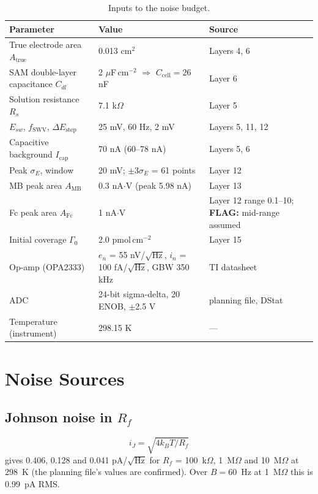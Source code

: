\documentclass[10pt]{article}
\numberwithin{equation}{section}
\newcommand{\flag}[1]{\textbf{FLAG:} #1}
\begin{document}
\begin{table}[h]
\centering\small
\begin{tabular}{@{}p{4.5cm}p{5.8cm}p{5.0cm}@{}}
\toprule
Parameter & Value & Source \\
\midrule
True electrode area $A_{\text{true}}$ & 0.013 cm$^2$ & Layers 4, 6 \\
SAM double-layer capacitance $C_{dl}$ & 2 $\mu$F\,cm$^{-2}$ $\Rightarrow$ $C_{\text{cell}} = 26$ nF & Layer 6 \\
Solution resistance $R_s$ & 7.1 k$\Omega$ & Layer 5 \\
$E_{sw}$, $f_{\text{SWV}}$, $\Delta E_{\text{step}}$ & 25 mV, 60 Hz, 2 mV & Layers 5, 11, 12 \\
Capacitive background $I_{\text{cap}}$ & 70 nA (60--78 nA) & Layers 5, 6 \\
Peak $\sigma_E$, window & 20 mV; $\pm3\sigma_E$ = 61 points & Layer 12 \\
MB peak area $A_{\text{MB}}$ & 0.3 nA$\cdot$V (peak 5.98 nA) & Layer 13 \\
Fc peak area $A_{\text{Fc}}$ & 1 nA$\cdot$V & Layer 12 range 0.1--10; \flag{mid-range assumed} \\
Initial coverage $\Gamma_0$ & 2.0 pmol\,cm$^{-2}$ & Layer 15 \\
Op-amp (OPA2333) & $e_n$ = 55 nV/$\sqrt{\text{Hz}}$, $i_n$ = 100 fA/$\sqrt{\text{Hz}}$, GBW 350 kHz & TI datasheet \cite{opa} \\
ADC & 24-bit sigma-delta, 20 ENOB, $\pm$2.5 V & planning file, DStat \\
Temperature (instrument) & 298.15 K & --- \\
\bottomrule
\end{tabular}
\caption{Inputs to the noise budget.}\label{tab:inputs}
\end{table}

\section{Noise Sources}

\subsection{Johnson noise in $R_f$}
\begin{equation}
i_J = \sqrt{4k_BT/R_f}
\end{equation}
gives 0.406, 0.128 and 0.041 pA/$\sqrt{\text{Hz}}$ for $R_f$ = 100~k$\Omega$, 1~M$\Omega$ and 10~M$\Omega$ at 298~K (the planning file's values
are confirmed). Over $B = 60$~Hz at 1~M$\Omega$ this is 0.99~pA RMS.
\end{document}
